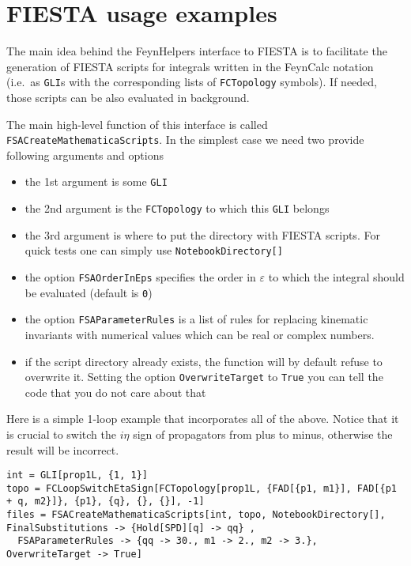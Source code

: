 \documentclass[../FeynHelpersManual.tex]{subfiles}
\begin{document}
\hypertarget{fiesta usage examples}{
\section{FIESTA usage examples}\label{fiesta usage examples}}

The main idea behind the FeynHelpers interface to FIESTA is to
facilitate the generation of FIESTA scripts for integrals written in the
FeynCalc notation (i.e.~as \texttt{GLI}s with the corresponding lists of
\texttt{FCTopology} symbols). If needed, those scripts can be also
evaluated in background.

The main high-level function of this interface is called
\texttt{FSACreateMathematicaScripts}. In the simplest case we need two
provide following arguments and options

\begin{itemize}
\tightlist
\item
  the 1st argument is some \texttt{GLI}
\item
  the 2nd argument is the \texttt{FCTopology} to which this \texttt{GLI}
  belongs
\item
  the 3rd argument is where to put the directory with FIESTA scripts.
  For quick tests one can simply use
  \texttt{NotebookDirectory[\allowbreak{}]}
\item
  the option \texttt{FSAOrderInEps} specifies the order in
  \(\varepsilon\) to which the integral should be evaluated (default is
  \texttt{0})
\item
  the option \texttt{FSAParameterRules} is a list of rules for replacing
  kinematic invariants with numerical values which can be real or
  complex numbers.
\item
  if the script directory already exists, the function will by default
  refuse to overwrite it. Setting the option \texttt{OverwriteTarget} to
  \texttt{True} you can tell the code that you do not care about that
\end{itemize}

Here is a simple 1-loop example that incorporates all of the above.
Notice that it is crucial to switch the \(i \eta\) sign of propagators
from plus to minus, otherwise the result will be incorrect.

\begin{verbatim}
int = GLI[prop1L, {1, 1}]
topo = FCLoopSwitchEtaSign[FCTopology[prop1L, {FAD[{p1, m1}], FAD[{p1 + q, m2}]}, {p1}, {q}, {}, {}], -1]
files = FSACreateMathematicaScripts[int, topo, NotebookDirectory[], FinalSubstitutions -> {Hold[SPD][q] -> qq} , 
  FSAParameterRules -> {qq -> 30., m1 -> 2., m2 -> 3.}, OverwriteTarget -> True]
\end{verbatim}
\end{document}
